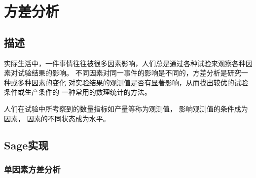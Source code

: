 \section{方差分析}
\subsection{描述}
实际生活中，一件事情往往被很多因素影响，人们总是通过各种试验来观察各种因素对试验结果的影响。
不同因素对同一事件的影响是不同的，方差分析是研究一种或多种因素的变化
对实验结果的观测值是否有显著影响，从而找出较优的试验条件或生产条件的
一种常用的数理统计的方法。

人们在试验中所考察到的数量指标如产量等称为观测值，
影响观测值的条件成为因素，
因素的不同状态成为水平。

\subsection{Sage实现}
\subsubsection{单因素方差分析}


